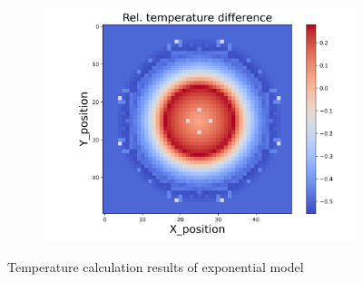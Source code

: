 \begin{figure}[h]
\begin{minipage}{\textwidth}
\begin{subfigure}{0.325\textwidth}
            \centering
            \includegraphics[width=\textwidth]{figures/raw_data/33/exp/T_bias.jpg}
        \end{subfigure}
    \end{minipage}
    \caption{Temperature calculation results of exponential model}  
\end{figure}
